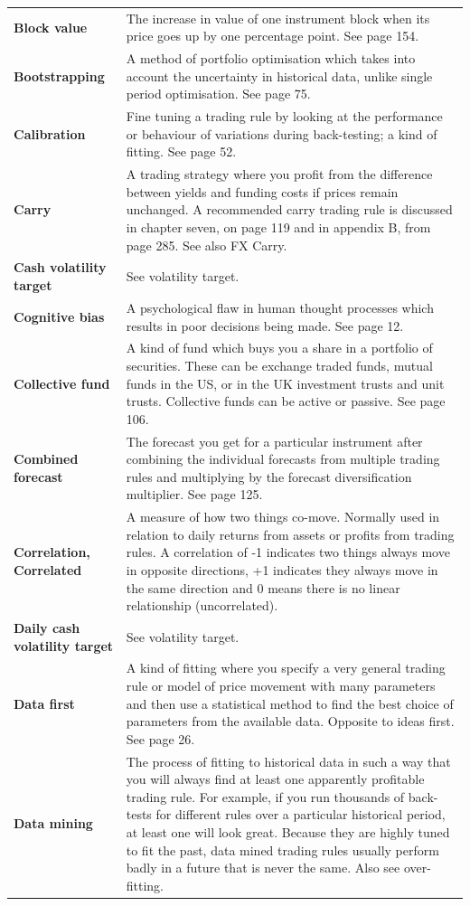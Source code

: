 {\begin{longtable}{@{}>{\raggedright\arraybackslash\bfseries} p{}>{\raggedright\arraybackslash} p{}@{}}
Block value & The increase in value of one instrument block when its price goes up by one percentage point. See page 154. \\[0.65em]
Bootstrapping & A method of portfolio optimisation which takes into account the uncertainty in historical data, unlike single period optimisation. See page 75. \\[0.65em]
Calibration & Fine tuning a trading rule by looking at the performance or behaviour of variations during back-testing; a kind of fitting. See page 52. \\[0.65em]
Carry & A trading strategy where you profit from the difference between yields and funding costs if prices remain unchanged. A recommended carry trading rule is discussed in chapter seven, on page 119 and in appendix B, from page 285. See also FX Carry. \\[0.65em]
Cash volatility target & See volatility target. \\[0.65em]
Cognitive bias & A psychological flaw in human thought processes which results in poor decisions being made. See page 12. \\[0.65em]
Collective fund & A kind of fund which buys you a share in a portfolio of securities. These can be exchange traded funds, mutual funds in the US, or in the UK investment trusts and unit trusts. Collective funds can be active or passive. See page 106. \\[0.65em]
Combined forecast & The forecast you get for a particular instrument after combining the individual forecasts from multiple trading rules and multiplying by the forecast diversification multiplier. See page 125. \\[0.65em]
Correlation, Correlated & A measure of how two things co-move. Normally used in relation to daily returns from assets or profits from trading rules. A correlation of -1 indicates two things always move in opposite directions, +1 indicates they always move in the same direction and 0 means there is no linear relationship (uncorrelated). \\[0.65em]
Daily cash volatility target & See volatility target. \\[0.65em]
Data first & A kind of fitting where you specify a very general trading rule or model of price movement with many parameters and then use a statistical method to find the best choice of parameters from the available data. Opposite to ideas first. See page 26. \\[0.65em]
Data mining & The process of fitting to historical data in such a way that you will always find at least one apparently profitable trading rule. For example, if you run thousands of back-tests for different rules over a particular historical period, at least one will look great. Because they are highly tuned to fit the past, data mined trading rules usually perform badly in a future that is never the same. Also see over-fitting. \\[0.65em]

\end{longtable}}
